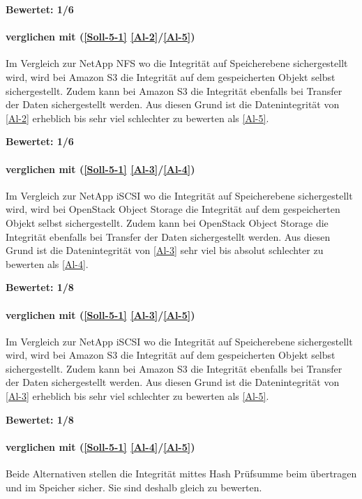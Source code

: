 \textbf{Bewertet: 1/6}

\paragraph*{  verglichen mit  (\ref{Soll-5-1} \ref{Al-2}/\ref{Al-5})}
Im Vergleich zur NetApp NFS wo die Integrität auf Speicherebene sichergestellt wird, wird bei Amazon S3 die Integrität auf dem gespeicherten Objekt selbst sichergestellt. Zudem kann bei Amazon S3 die Integrität ebenfalls bei Transfer der Daten sichergestellt werden. Aus diesen Grund ist die Datenintegrität von  \ref{Al-2} erheblich bis sehr viel schlechter zu bewerten als  \ref{Al-5}.

\textbf{Bewertet: 1/6}


\paragraph*{  verglichen mit  (\ref{Soll-5-1} \ref{Al-3}/\ref{Al-4})}
Im Vergleich zur NetApp iSCSI wo die Integrität auf Speicherebene sichergestellt wird, wird bei OpenStack Object Storage die Integrität auf dem gespeicherten Objekt selbst sichergestellt. Zudem kann bei OpenStack Object Storage die Integrität ebenfalls bei Transfer der Daten sichergestellt werden. Aus diesen Grund ist die Datenintegrität von  \ref{Al-3} sehr viel bis absolut schlechter zu bewerten als  \ref{Al-4}.

\textbf{Bewertet: 1/8}


\paragraph*{  verglichen mit  (\ref{Soll-5-1} \ref{Al-3}/\ref{Al-5})}
Im Vergleich zur NetApp iSCSI wo die Integrität auf Speicherebene sichergestellt wird, wird bei Amazon S3 die Integrität auf dem gespeicherten Objekt selbst sichergestellt. Zudem kann bei Amazon S3 die Integrität ebenfalls bei Transfer der Daten sichergestellt werden. Aus diesen Grund ist die Datenintegrität von  \ref{Al-3} erheblich bis sehr viel schlechter zu bewerten als  \ref{Al-5}.

\textbf{Bewertet: 1/8}

\paragraph*{  verglichen mit  (\ref{Soll-5-1} \ref{Al-4}/\ref{Al-5})}
Beide Alternativen stellen die Integrität mittes Hash Prüfsumme beim übertragen und im Speicher sicher. Sie sind deshalb gleich zu bewerten.

